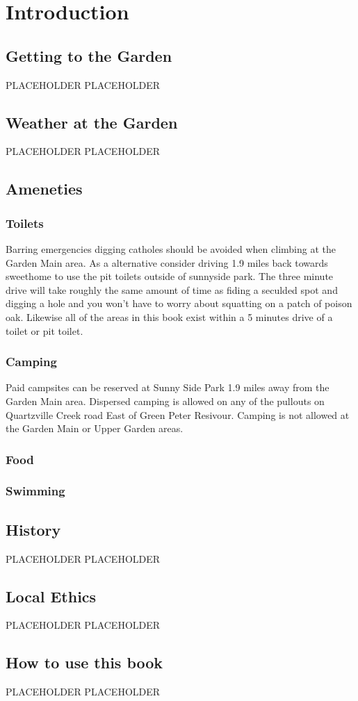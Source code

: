 \chapter{Introduction}
\lhead{\textcolor{\chapterColor}{\rule[-2pt]{\textwidth}{15pt}}}
\section{Getting to the Garden}
PLACEHOLDER
\lipsum[1]
PLACEHOLDER
\section{Weather at the Garden}
PLACEHOLDER
\lipsum[1]
PLACEHOLDER
\section{Ameneties}
\subsection*{Toilets}
Barring emergencies digging catholes should be avoided when climbing at the Garden Main area. As a alternative consider driving 1.9 miles back towards sweethome to use the pit toilets outside of sunnyside park. The three minute drive will take roughly the same amount of time as fiding a seculded spot and digging a hole and you won't have to worry about squatting on a patch of poison oak. Likewise all of the areas in this book exist within a 5 minutes drive of a toilet or pit toilet. 
\subsection*{Camping}
Paid campsites can be reserved at Sunny Side Park 1.9 miles away from the Garden Main area. Dispersed camping is allowed on any of the pullouts on Quartzville Creek road East of Green Peter Resivour. Camping is not allowed at the Garden Main or Upper Garden areas.
\subsection*{Food}
\subsection*{Swimming}
\section{History}
PLACEHOLDER
\lipsum[1]
PLACEHOLDER
\section{Local Ethics}
PLACEHOLDER
\lipsum[1]
PLACEHOLDER
\section{How to use this book}
PLACEHOLDER
\lipsum[1]
PLACEHOLDER                                                                           